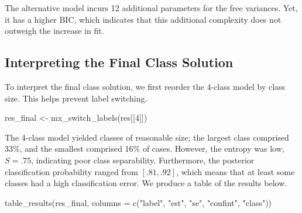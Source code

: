 \documentclass[
  man,floatsintext]{apa6}
\newenvironment{Shaded}{\begin{snugshade}}{\end{snugshade}}
\newcommand{\AttributeTok}[1]{\textcolor[rgb]{0.77,0.63,0.00}{#1}}
\newcommand{\DecValTok}[1]{\textcolor[rgb]{0.00,0.00,0.81}{#1}}
\newcommand{\FunctionTok}[1]{\textcolor[rgb]{0.00,0.00,0.00}{#1}}
\newcommand{\NormalTok}[1]{#1}
\newcommand{\OtherTok}[1]{\textcolor[rgb]{0.56,0.35,0.01}{#1}}
\newcommand{\StringTok}[1]{\textcolor[rgb]{0.31,0.60,0.02}{#1}}
\begin{document}
The alternative model incurs 12 additional parameters for the free variances.
Yet, it has a higher BIC, which indicates that this additional complexity does not outweigh the increase in fit.

\hypertarget{interpreting-the-final-class-solution}{%
\subsection{Interpreting the Final Class Solution}\label{interpreting-the-final-class-solution}}

To interpret the final class solution, we first reorder the 4-class model by class size.
This helps prevent label switching.

\begin{Shaded}
\begin{Highlighting}[]
\NormalTok{res\_final }\OtherTok{\textless{}{-}} \FunctionTok{mx\_switch\_labels}\NormalTok{(res[[}\DecValTok{4}\NormalTok{]])}
\end{Highlighting}
\end{Shaded}

The 4-class model yielded classes of reasonable size; the largest class comprised 33\%, and the smallest comprised 16\% of cases.
However, the entropy was low, \(S = .75\), indicating poor class separability.
Furthermore, the posterior classification probability ranged from \([.81, .92]\), which means that at least some classes had a high classification error.
We produce a table of the results below.

\begin{Shaded}
\begin{Highlighting}[]
\FunctionTok{table\_results}\NormalTok{(res\_final, }\AttributeTok{columns =} \FunctionTok{c}\NormalTok{(}\StringTok{"label"}\NormalTok{, }\StringTok{"est"}\NormalTok{, }\StringTok{"se"}\NormalTok{, }\StringTok{"confint"}\NormalTok{, }\StringTok{"class"}\NormalTok{))}
\end{Highlighting}
\end{Shaded}
\end{document}
